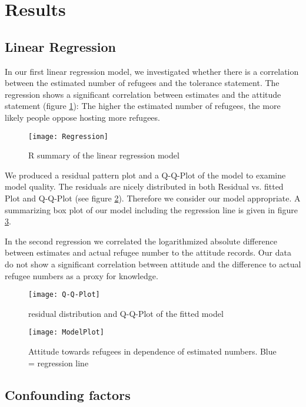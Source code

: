 \documentclass{article}
\begin{document}

\newpage

\section{Results}


\subsection{Linear Regression}
In our first linear regression model, we investigated whether there is a correlation between the estimated number of refugees and the tolerance statement. 
The regression shows a significant correlation between estimates and the attitude statement (figure \ref{fig: Regression}): The higher the estimated number of refugees, the more likely people oppose hosting more refugees.

\begin{figure}[H]
	\centering 
	\texttt{[image: Regression]}
	\caption{R summary of the linear regression model}\label{fig: Regression}
\end{figure}

We produced a residual pattern plot and a Q-Q-Plot of the model to examine model quality. The residuals are nicely distributed in both Residual vs. fitted Plot and Q-Q-Plot (see figure \ref{fig: Q-Q-Plot}). Therefore we consider our model appropriate.
A summarizing box plot of our model including the regression line is given in figure \ref{fig: ModelPlot}.

In the second regression we correlated the logarithmized absolute difference between estimates and actual refugee number to the attitude records. Our data do not show a significant correlation between attitude and the difference to actual refugee numbers as a proxy for knowledge.



\begin{figure}[H]
	\centering 
	\texttt{[image: Q-Q-Plot]}
	\caption{residual distribution and Q-Q-Plot of the fitted model}\label{fig: Q-Q-Plot}
\end{figure}


\begin{figure}[H]
	\centering 
	\texttt{[image: ModelPlot]}
	\caption{Attitude towards refugees in dependence of estimated numbers. Blue = regression line}\label{fig: ModelPlot}
\end{figure}


\subsection{Confounding factors}
\end{document}

